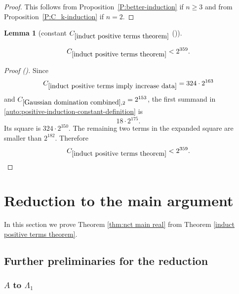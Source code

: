 \documentclass[12pt,reqno]{amsart}
\newcommand{\auto}{{({\tiny\faCar})}}
\theoremstyle{plain}
\newtheorem{lemma}[theorem]{Lemma}
\numberwithin{equation}{section}
\theoremstyle{remark}
\newcommand{\uses}[1]{}
\newcommand{\usesdefs}[1]{}
\newcommand{\leanok}{}
\newcommand{\lean}[1]{}
\begin{document}
\begin{proof}
This follows from Proposition~\ref{P:better-induction} if $n\ge 3$ and from Proposition~\ref{P:C_k-induction} if $n=2$.
\end{proof}

\begin{lemma}[constant $C_{\ref{induct positive terms theorem}}$ \auto]\label{constant induct positive terms theorem}\uses{induct positive terms imply increase data,Gaussian domination combined,induct positive terms theorem}\usesdefs{}
\lean{Auto.constantInductPositiveTermsTheorem}
\leanok
\begin{equation}\label{constant induct positive terms theorem bound}
C_{\ref{induct positive terms theorem}}<2^{359}.
\end{equation}
\end{lemma}
\begin{proof}[Proof \auto]
Since
\[
C_{\ref{induct positive terms imply increase data}}
=324\cdot2^{163}
\]
and $C_{\ref{Gaussian domination combined},2}=2^{153}$, the first summand in \eqref{auto:positive-induction-constant-definition} is
\[
18\cdot2^{175}.
\]
Its square is $324\cdot2^{350}$. The remaining two terms in the expanded square are smaller than $2^{182}$. Therefore
\[
C_{\ref{induct positive terms theorem}}
<2^{359}.
\]
\end{proof}


\section{Reduction to the main argument}\label{sec:reduction}
In this section we prove Theorem \ref{thm:nct main real} from Theorem \ref{induct positive terms theorem}.

\subsection{Further preliminaries for the reduction}\label{sec:prelim red}

\subsubsection{\texorpdfstring{$A$ to $\Lambda_1$}{Average to prism form}}
\end{document}
